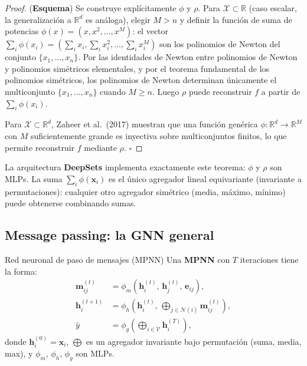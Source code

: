 \begin{proof}
(\textbf{Esquema}) Se construye explícitamente $\phi$ y $\rho$.
Para $\mathcal{X} \subset \mathbb{R}$ (caso escalar, la generalización a
$\mathbb{R}^d$ es análoga), elegir $M > n$ y definir la función de suma de
potencias $\phi(x) = (x, x^2, \ldots, x^M)$: el vector $\sum_i \phi(x_i) =
(\sum_i x_i, \sum_i x_i^2, \ldots, \sum_i x_i^M)$ son los polinomios de
Newton del conjunto $\{x_1,\ldots,x_n\}$. Por las identidades de Newton entre
polinomios de Newton y polinomios simétricos elementales, y por el teorema
fundamental de los polinomios simétricos, los polinomios de Newton determinan
únicamente el multiconjunto $\{x_1,\ldots,x_n\}$ cuando $M \geq n$. Luego
$\rho$ puede reconstruir $f$ a partir de $\sum_i\phi(x_i)$.

Para $\mathcal{X} \subset \mathbb{R}^d$, Zaheer et al.\ (2017) muestran que
una función genérica $\phi: \mathbb{R}^d \to \mathbb{R}^M$ con $M$ suficientemente
grande es inyectiva sobre multiconjuntos finitos, lo que permite reconstruir
$f$ mediante $\rho$. $\square$
\end{proof}

La arquitectura \textbf{DeepSets} implementa exactamente este teorema:
$\phi$ y $\rho$ son MLPs. La suma $\sum_i \phi(\bm{x}_i)$ es el único
agregador lineal equivariante (invariante a permutaciones): cualquier otro
agregador simétrico (media, máximo, mínimo) puede obtenerse combinando sumas.

\subsection{Message passing: la GNN general}
\label{subsec:message_passing}

\begin{definicion}{Red neuronal de paso de mensajes (MPNN)}
\label{def:mpnn}
Una \textbf{MPNN} con $T$ iteraciones tiene la forma:
\begin{align}
  \bm{m}_{ij}^{(t)}
  &= \phi_m\!\left(\bm{h}_i^{(t)},\, \bm{h}_j^{(t)},\, \bm{e}_{ij}\right),
  \tag{mensaje} \label{eq:mensaje}\\
  \bm{h}_i^{(t+1)}
  &= \phi_h\!\left(\bm{h}_i^{(t)},\,
    \bigoplus_{j \in \mathcal{N}(i)} \bm{m}_{ij}^{(t)}\right),
  \tag{actualización} \label{eq:actualizacion}\\
  \hat{y}
  &= \phi_g\!\left(\bigoplus_{i \in \mathcal{V}} \bm{h}_i^{(T)}\right),
  \tag{readout} \label{eq:readout}
\end{align}
donde $\bm{h}_i^{(0)} = \bm{x}_i$, $\bigoplus$ es un agregador invariante
bajo permutación (suma, media, max), y $\phi_m$, $\phi_h$, $\phi_g$ son MLPs.
\end{definicion}

